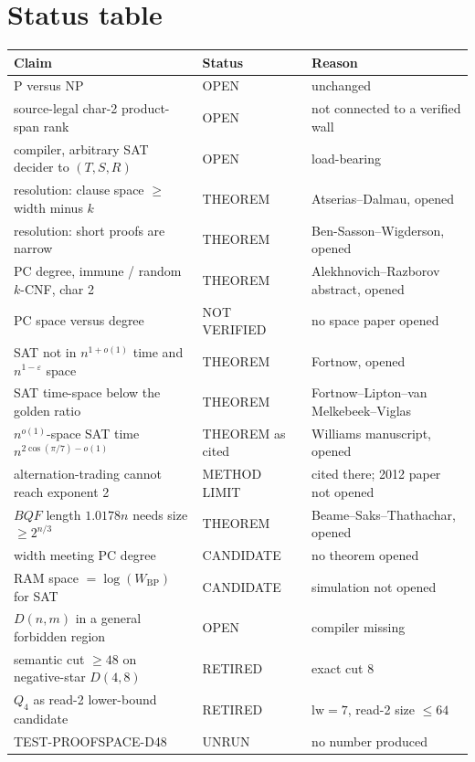 \documentclass[11pt]{article}
\begin{document}
\section*{Status table}
{\footnotesize
\begin{tabular}{@{}p{}p{}p{}@{}}
\toprule
Claim & Status & Reason \\
\midrule
P versus NP & OPEN & unchanged \\
source-legal char-2 product-span rank & OPEN & not connected to a verified wall \\
compiler, arbitrary SAT decider to \((T,S,R)\) & OPEN & load-bearing \\
resolution: clause space \(\ge\) width minus \(k\) & THEOREM & Atserias--Dalmau, opened \\
resolution: short proofs are narrow & THEOREM & Ben-Sasson--Wigderson, opened \\
PC degree, immune / random \(k\)-CNF, char 2 & THEOREM & Alekhnovich--Razborov abstract, opened \\
PC space versus degree & NOT VERIFIED & no space paper opened \\
SAT not in \(n^{1+o(1)}\) time and \(n^{1-\varepsilon}\) space & THEOREM & Fortnow, opened \\
SAT time-space below the golden ratio & THEOREM & Fortnow--Lipton--van Melkebeek--Viglas \\
\(n^{o(1)}\)-space SAT time \(n^{2\cos(\pi/7)-o(1)}\) & THEOREM as cited & Williams manuscript, opened \\
alternation-trading cannot reach exponent 2 & METHOD LIMIT & cited there; 2012 paper not opened \\
\(BQF\) length \(1.0178n\) needs size \(\ge 2^{n/3}\) & THEOREM & Beame--Saks--Thathachar, opened \\
width meeting PC degree & CANDIDATE & no theorem opened \\
RAM space \(= \log(W_{\mathrm{BP}})\) for SAT & CANDIDATE & simulation not opened \\
\(D(n,m)\) in a general forbidden region & OPEN & compiler missing \\
semantic cut \(\ge 48\) on negative-star \(D(4,8)\) & RETIRED & exact cut 8 \\
\(Q_4\) as read-2 lower-bound candidate & RETIRED & \(\mathrm{lw}=7\), read-2 size \(\le 64\) \\
TEST-PROOFSPACE-D48 & UNRUN & no number produced \\
\bottomrule
\end{tabular}
}
\end{document}
